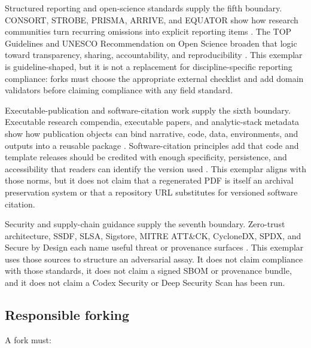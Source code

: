 \documentclass[
  english,
]{article}
\begin{document}
Structured reporting and open-science standards supply the fifth
boundary. CONSORT, STROBE, PRISMA, ARRIVE, and EQUATOR show how research
communities turn recurring omissions into explicit reporting items
\citep{schulz2010consort, vonelm2007strobe, page2021prisma, percie_du_sert2020arrive, equator_network_reporting_guidelines}.
The TOP Guidelines and UNESCO Recommendation on Open Science broaden
that logic toward transparency, sharing, accountability, and
reproducibility \citep{nosek2015top, unesco2021_open_science}. This
exemplar is guideline-shaped, but it is not a replacement for
discipline-specific reporting compliance: forks must choose the
appropriate external checklist and add domain validators before claiming
compliance with any field standard.

Executable-publication and software-citation work supply the sixth
boundary. Executable research compendia, executable papers, and
analytic-stack metadata show how publication objects can bind narrative,
code, data, environments, and outputs into a reusable package
\citep{nuest2017erc, lasser2020executable, chen2021metadata}.
Software-citation principles add that code and template releases should
be credited with enough specificity, persistence, and accessibility that
readers can identify the version used \citep{smith2016softwarecitation}.
This exemplar aligns with those norms, but it does not claim that a
regenerated PDF is itself an archival preservation system or that a
repository URL substitutes for versioned software citation.

Security and supply-chain guidance supply the seventh boundary.
Zero-trust architecture, SSDF, SLSA, Sigstore, MITRE ATT\&CK, CycloneDX,
SPDX, and Secure by Design each name useful threat or provenance
surfaces
\citep{nist_sp800_207_zero_trust, nist_sp800_218_ssdf, slsa_v1_2, sigstore_docs, mitre_attack, cyclonedx_spec, spdx_spec, cisa_secure_by_design}.
This exemplar uses those sources to structure an adversarial assay. It
does not claim compliance with those standards, it does not claim a
signed SBOM or provenance bundle, and it does not claim a Codex Security
or Deep Security Scan has been run.

\subsection{Responsible forking}\label{responsible-forking}

A fork must:
\end{document}
